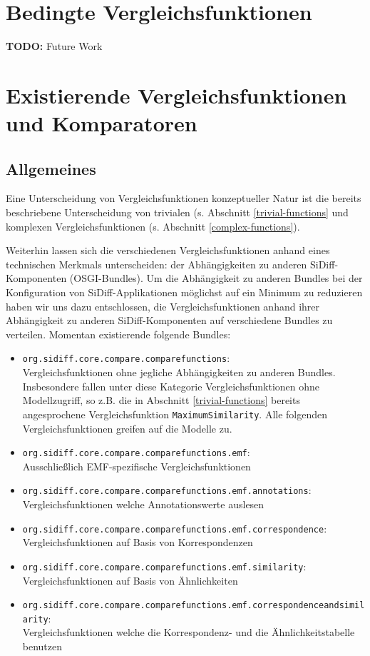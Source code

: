 \documentclass[10pt,a4paper]{scrartcl}
\begin{document}
\section{Bedingte Vergleichsfunktionen}
\textbf{TODO:} Future Work


\section{Existierende Vergleichsfunktionen und Komparatoren}

\subsection{Allgemeines}
\label{existierende-allgemeines}
Eine Unterscheidung von Vergleichsfunktionen konzeptueller Natur ist die bereits beschriebene
Unterscheidung von trivialen (s. Abschnitt \ref{trivial-functions} und komplexen 
Vergleichsfunktionen (s. Abschnitt \ref{complex-functions}).

Weiterhin lassen sich die verschiedenen Vergleichsfunktionen anhand eines technischen Merkmals
unterscheiden: der Abhängigkeiten zu anderen SiDiff-Komponenten (OSGI-Bundles). 
Um die Abhängigkeit zu anderen Bundles bei der Konfiguration von SiDiff-Applikationen
möglichst auf ein Minimum zu reduzieren haben wir uns dazu entschlossen, die Vergleichsfunktionen
anhand ihrer Abhängigkeit zu anderen SiDiff-Komponenten auf verschiedene Bundles zu verteilen.
Momentan existierende folgende Bundles:



\begin{itemize}
\item \texttt{org.sidiff.core.compare.comparefunctions}:\\
	Vergleichsfunktionen ohne jegliche Abhängigkeiten zu anderen Bundles. Insbesondere fallen
	unter diese Kategorie Vergleichsfunktionen ohne Modellzugriff, so z.B. die in Abschnitt
	\ref{trivial-functions} bereits angesprochene Vergleichsfunktion \texttt{MaximumSimilarity}.
	Alle folgenden Vergleichsfunktionen greifen auf die Modelle zu.
\item \texttt{org.sidiff.core.compare.comparefunctions.emf}:\\
	Ausschließlich EMF-spezifische Vergleichsfunktionen
\item \texttt{org.sidiff.core.compare.comparefunctions.emf.annotations}:\\
	Vergleichsfunktionen welche Annotationswerte auslesen
\item \texttt{org.sidiff.core.compare.comparefunctions.emf.correspondence}:\\
	Vergleichsfunktionen auf Basis von Korrespondenzen
\item \texttt{org.sidiff.core.compare.comparefunctions.emf.similarity}:\\
	Vergleichsfunktionen auf Basis von Ähnlichkeiten
\item \texttt{org.sidiff.core.compare.comparefunctions.emf.correspondenceandsimilarity}:\\
	Vergleichsfunktionen welche die Korrespondenz- und die Ähnlichkeitstabelle benutzen
\end{itemize}
\end{document}
